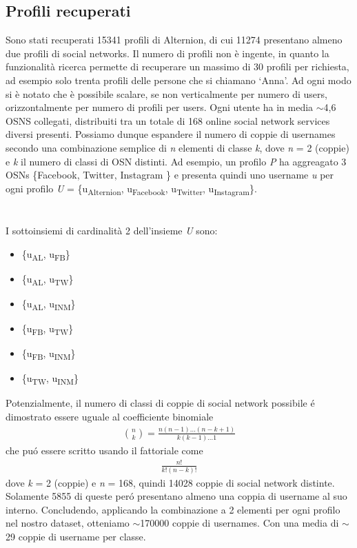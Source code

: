 \subsection{Profili recuperati}
Sono stati recuperati 15341 profili di Alternion, di cui 11274 presentano almeno due profili di social networks. Il numero di profili non è ingente, in quanto la funzionalità ricerca permette di recuperare un massimo di 30 profili per richiesta, ad esempio solo trenta profili delle persone che si chiamano `Anna'. Ad ogni modo si è notato che è possibile scalare, se non verticalmente per numero di users, orizzontalmente per numero di profili per users. Ogni utente ha in media $\sim$4,6 OSNS collegati, distribuiti tra un totale di 168 online social network services diversi presenti. Possiamo dunque espandere il numero di coppie di usernames secondo una combinazione semplice di \textit{n} elementi di classe \textit{k}, dove \textit{n} = 2 (coppie) e \textit{k} il numero di classi di OSN distinti. Ad esempio, un profilo \textit{P} ha aggreagato 3 OSNs \{Facebook, Twitter, Instagram \} e presenta quindi uno username \textit{u} per ogni profilo
\textit{U} = \{u\textsubscript{Alternion}, u\textsubscript{Facebook}, u\textsubscript{Twitter}, u\textsubscript{Instagram}\}.\\ \\ \\ I sottoinsiemi di cardinalità 2 dell'insieme \textit{U} sono:
\begin{itemize}
  \item \{u\textsubscript{AL}, u\textsubscript{FB}\}
  \item \{u\textsubscript{AL}, u\textsubscript{TW}\}
  \item \{u\textsubscript{AL}, u\textsubscript{INM}\}
  \item \{u\textsubscript{FB}, u\textsubscript{TW}\}
  \item \{u\textsubscript{FB}, u\textsubscript{INM}\}
  \item \{u\textsubscript{TW}, u\textsubscript{INM}\}
\end{itemize}
Potenzialmente, il numero di classi di coppie di social network possibile é dimostrato essere uguale al coefficiente binomiale
\begin{gather*}
  \binom nk = \frac{n(n-1)\ldots(n-k+1)}{k(k-1)\dots1}
\end{gather*}
che puó essere scritto usando il fattoriale come
\begin{gather*}
  \frac{n!}{k!(n-k)!}
\end{gather*}
dove \textit{k} = 2 (coppie) e \textit{n} = 168, quindi 14028 coppie di social network distinte. Solamente 5855 di queste peró presentano almeno una coppia di username al suo interno. Concludendo, applicando la combinazione a 2 elementi per ogni profilo nel nostro dataset, otteniamo $\sim$170000 coppie di usernames. Con una media di $\sim$29 coppie di username per classe.
